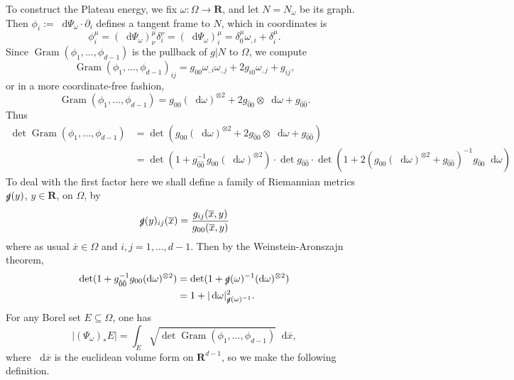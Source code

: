\documentclass[reqno,12pt,letterpaper]{amsart}
\newcommand{\RR}{\mathbf{R}}
\newcommand*\dif{\mathop{}\!\mathrm{d}}
\DeclareMathOperator{\Gram}{Gram}
\theoremstyle{definition}
\numberwithin{equation}{section}
\begin{document}
To construct the Plateau energy, we fix $\omega: \Omega \to \RR$, and let $N = N_\omega$ be its graph.
Then $\phi_i := \dif \Psi_\omega \cdot \partial_i$ defines a tangent frame to $N$, which in coordinates is 
\begin{equation}\label{vector in frame}
\phi_i^\mu = (\dif \Psi_\omega)_\nu^\mu \delta_i^\nu = (\dif \Psi_\omega)_i^\mu = \delta^\mu_0 \omega_{,i} + \delta_i^\mu.
\end{equation}
Since $\Gram(\phi_1, \dots, \phi_{d - 1})$ is the pullback of $g|N$ to $\Omega$, we compute
$$\Gram(\phi_1, \dots, \phi_{d - 1})_{ij} = g_{00} \omega_{,i} \omega_{,j} + 2g_{i0} \omega_{,j} + g_{ij},$$
or in a more coordinate-free fashion,
\begin{equation}\label{Gram form for a frame}
\Gram(\phi_1, \dots, \phi_{d - 1}) = g_{00} (\dif \omega)^{\otimes 2} + 2g_{\hat 00} \otimes \dif \omega + g_{\hat 0\hat 0}.
\end{equation}
Thus 
\begin{align*}
\det \Gram(\phi_1, \dots, \phi_{d - 1}) &= \det(g_{00} (\dif \omega)^{\otimes 2} + 2g_{\hat 00} \otimes \dif \omega + g_{\hat 0 \hat 0}) \\
&= \det(1 + g_{\hat 0\hat 0}^{-1} g_{00} (\dif \omega)^{\otimes 2}) \cdot \det g_{\hat 0\hat 0} \cdot \det(1 + 2(g_{00} (\dif \omega)^{\otimes 2} + g_{\hat 0\hat 0})^{-1} g_{\hat 00} \dif \omega)
\end{align*}
To deal with the first factor here we shall define a family of Riemannian metrics $\slashed g(y)$, $y \in \RR$, on $\Omega$, by 
\begin{equation}\label{slashed metric}
\slashed g(y)_{ij}(\overline x) = \frac{g_{ij}(\overline x, y)}{g_{00}(\overline x, y)}
\end{equation}
where as usual $\overline x \in \Omega$ and $i,j = 1, \dots, d - 1$.
Then by the Weinstein-Aronszajn theorem,
\begin{align*}
\det(1 + g_{\hat 0\hat 0}^{-1} g_{00} (\dif \omega)^{\otimes 2}) &= \det(1 + \slashed g(\omega)^{-1} (\dif \omega)^{\otimes 2}) \\
&= 1 + |\dif \omega|_{\slashed g(\omega)^{-1}}^2.
\end{align*}
For any Borel set $E \subseteq \Omega$, one has 
$$|(\Psi_\omega)_* E| = \int_E \sqrt{\det \Gram(\phi_1, \dots, \phi_{d - 1})} \dif \overline x,$$
where $\dif \overline x$ is the euclidean volume form on $\RR^{d - 1}$, so we make the following definition.
\end{document}
